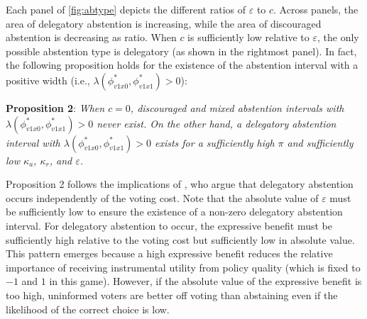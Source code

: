 \documentclass[doc,natbib,12pt]{apa6}
\begin{document}
	\par Each panel of \autoref{fig:abtype} depicts the different ratios of $\varepsilon$ to $c$. Across panels, the area of delegatory abstention is increasing, while the area of discouraged abstention is decreasing as ratio. When $c$ is sufficiently low relative to $\varepsilon$, the only possible abstention type is delegatory (as shown in the rightmost panel). In fact, the following proposition holds for the existence of the abstention interval with a positive width (i.e., $\lambda(\phi^*_{v1x0},\phi^*_{v1x1})>0$):
	
	\noindent \textbf{Proposition 2}: \textit{When $c=0$, discouraged and mixed abstention intervals with $\lambda(\phi^*_{v1x0},\phi^*_{v1x1})>0$ never exist. On the other hand, a delegatory abstention interval with $\lambda(\phi^*_{v1x0},\phi^*_{v1x1})>0$ exists for a sufficiently high $\pi$ and sufficiently low $\kappa_a$, $\kappa_r$, and $\varepsilon$.}
	
	\noindent Proposition 2 follows the implications of \cite{Feddersen1996thsw}, who argue that delegatory abstention occurs independently of the voting cost. Note that the absolute value of $\varepsilon$ must be sufficiently low to ensure the existence of a non-zero delegatory abstention interval. For delegatory abstention to occur, the expressive benefit must be sufficiently high relative to the voting cost but sufficiently low in absolute value. This pattern emerges because a high expressive benefit reduces the relative importance of receiving instrumental utility from policy quality (which is fixed to $-1$ and $1$ in this game). However, if the absolute value of the expressive benefit is too high, uninformed voters are better off voting than abstaining even if the likelihood of the correct choice is low.
	
\end{document}

